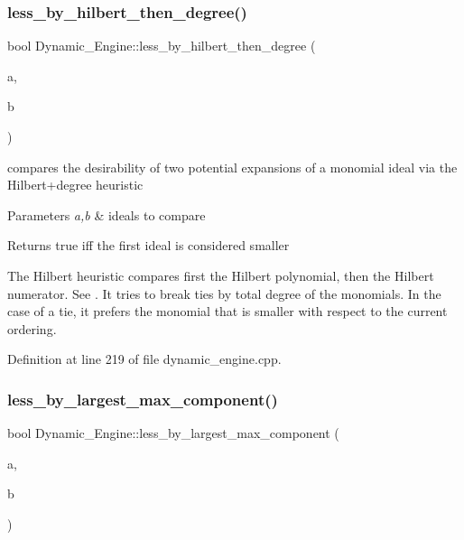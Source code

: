 \subsubsection{\texorpdfstring{less\+\_\+by\+\_\+hilbert\+\_\+then\+\_\+degree()}{less\_by\_hilbert\_then\_degree()}}
{\footnotesize\ttfamily bool Dynamic\+\_\+\+Engine\+::less\+\_\+by\+\_\+hilbert\+\_\+then\+\_\+degree (\begin{DoxyParamCaption}\item[{\hyperlink{group___g_b_computation_class_dynamic___engine_1_1_p_p___with___ideal}{P\+P\+\_\+\+With\+\_\+\+Ideal} \&}]{a,  }\item[{\hyperlink{group___g_b_computation_class_dynamic___engine_1_1_p_p___with___ideal}{P\+P\+\_\+\+With\+\_\+\+Ideal} \&}]{b }\end{DoxyParamCaption})}



compares the desirability of two potential expansions of a monomial ideal via the Hilbert+degree heuristic 


\begin{DoxyParams}{Parameters}
{\em a,b} & ideals to compare \\
\hline
\end{DoxyParams}
\begin{DoxyReturn}{Returns}
{\ttfamily true} iff the first ideal is considered smaller
\end{DoxyReturn}
The Hilbert heuristic compares first the Hilbert polynomial, then the Hilbert numerator. See \cite{CaboaraDynAlg}. It tries to break ties by total degree of the monomials. In the case of a tie, it prefers the monomial that is smaller with respect to the current ordering. 

Definition at line 219 of file dynamic\+\_\+engine.\+cpp.

\mbox{\label{namespace_dynamic___engine_acbc39a829236f4021485cc631f030264}} 
\subsubsection{\texorpdfstring{less\+\_\+by\+\_\+largest\+\_\+max\+\_\+component()}{less\_by\_largest\_max\_component()}}
{\footnotesize\ttfamily bool Dynamic\+\_\+\+Engine\+::less\+\_\+by\+\_\+largest\+\_\+max\+\_\+component (\begin{DoxyParamCaption}\item[{\hyperlink{group___g_b_computation_class_dynamic___engine_1_1_p_p___with___ideal}{P\+P\+\_\+\+With\+\_\+\+Ideal} \&}]{a,  }\item[{\hyperlink{group___g_b_computation_class_dynamic___engine_1_1_p_p___with___ideal}{P\+P\+\_\+\+With\+\_\+\+Ideal} \&}]{b }\end{DoxyParamCaption})}




